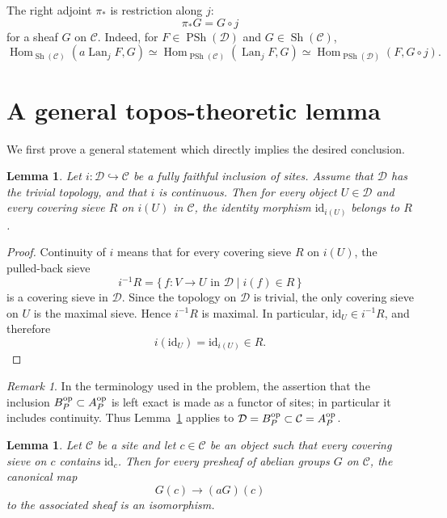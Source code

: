 \documentclass{article}
\newtheorem{lemma}[theorem]{Lemma}
\theoremstyle{remark}
\newtheorem{remark}[theorem]{Remark}
\begin{document}
The right adjoint \(\pi_\ast\) is restriction along \(j\):
\[
\pi_\ast G = G\circ j
\]
for a sheaf \(G\) on \(\mathcal C\).  Indeed, for \(F\in
\operatorname{PSh}(\mathcal D)\) and \(G\in \operatorname{Sh}(\mathcal C)\),
\[
\operatorname{Hom}_{\operatorname{Sh}(\mathcal C)}(a\operatorname{Lan}_jF,G)
\simeq
\operatorname{Hom}_{\operatorname{PSh}(\mathcal C)}(\operatorname{Lan}_jF,G)
\simeq
\operatorname{Hom}_{\operatorname{PSh}(\mathcal D)}(F,G\circ j).
\]

\section{A general topos-theoretic lemma}

We first prove a general statement which directly implies the desired
conclusion.

\begin{lemma}\label{lemma:discrete}
Let \(i:\mathcal D\hookrightarrow \mathcal C\) be a fully faithful
inclusion of sites.  Assume that \(\mathcal D\) has the trivial
topology, and that \(i\) is continuous.  Then for every object
\(U\in\mathcal D\) and every covering sieve \(R\) on \(i(U)\) in
\(\mathcal C\), the identity morphism \(\mathrm{id}_{i(U)}\) belongs to
\(R\).
\end{lemma}

\begin{proof}
Continuity of \(i\) means that for every covering sieve \(R\) on
\(i(U)\), the pulled-back sieve
\[
i^{-1}R=\{\,f:V\to U\text{ in }\mathcal D \mid i(f)\in R\,\}
\]
is a covering sieve in \(\mathcal D\).  Since the topology on
\(\mathcal D\) is trivial, the only covering sieve on \(U\) is the
maximal sieve.  Hence \(i^{-1}R\) is maximal.  In particular,
\(\mathrm{id}_U\in i^{-1}R\), and therefore
\[
i(\mathrm{id}_U)=\mathrm{id}_{i(U)}\in R.
\]
\end{proof}

\begin{remark}
In the terminology used in the problem, the assertion that the
inclusion \(B_P^{\rm op}\subset A_P^{\rm op}\) is left exact is made
as a functor of sites; in particular it includes continuity.  Thus
Lemma~\ref{lemma:discrete} applies to
\(\mathcal D=B_P^{\rm op}\subset \mathcal C=A_P^{\rm op}\).
\end{remark}

\begin{lemma}\label{lemma:sheafification-value}
Let \(\mathcal C\) be a site and let \(c\in\mathcal C\) be an object
such that every covering sieve on \(c\) contains
\(\mathrm{id}_c\).  Then for every presheaf of abelian groups
\(G\) on \(\mathcal C\), the canonical map
\[
G(c)\longrightarrow (aG)(c)
\]
to the associated sheaf is an isomorphism.
\end{lemma}
\end{document}
